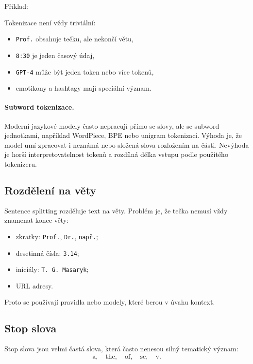 Příklad:
\begin{quote}
\end{quote}

Tokenizace není vždy triviální:
\begin{itemize}
    \item \texttt{Prof.} obsahuje tečku, ale nekončí větu,
    \item \texttt{8:30} je jeden časový údaj,
    \item \texttt{GPT-4} může být jeden token nebo více tokenů,
    \item emotikony a hashtagy mají speciální význam.
\end{itemize}

\paragraph{Subword tokenizace.}
Moderní jazykové modely často nepracují přímo se slovy, ale se subword jednotkami, například WordPiece, BPE
nebo unigram tokenizací. Výhoda je, že model umí zpracovat i neznámá nebo složená slova rozložením na části.
Nevýhoda je horší interpretovatelnost tokenů a rozdílná délka vstupu podle použitého tokenizeru.

\subsection{Rozdělení na věty}

Sentence splitting rozděluje text na věty. Problém je, že tečka nemusí vždy znamenat konec věty:
\begin{itemize}
    \item zkratky: \texttt{Prof.}, \texttt{Dr.}, \texttt{např.};
    \item desetinná čísla: \texttt{3.14};
    \item iniciály: \texttt{T. G. Masaryk};
    \item URL adresy.
\end{itemize}

Proto se používají pravidla nebo modely, které berou v úvahu kontext.

\subsection{Stop slova}

Stop slova jsou velmi častá slova, která často nenesou silný tematický význam:
\[
\text{a},\quad \text{the},\quad \text{of},\quad \text{se},\quad \text{v}.
\]

